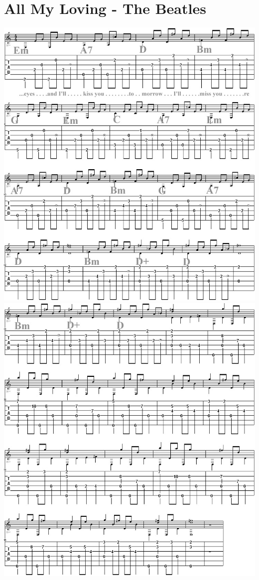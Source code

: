 \documentclass[]{book}
\let\stdsection\section
\renewcommand\section{\clearpage\stdsection}
\begin{document}
\hypertarget{all-my-loving---the-beatles}{%
\section{All My Loving - The Beatles}\label{all-my-loving---the-beatles}}

\includegraphics{notes_and_tabs/allmy_loving_s1.png}
\includegraphics{notes_and_tabs/allmy_loving_s2.png}
\end{document}
